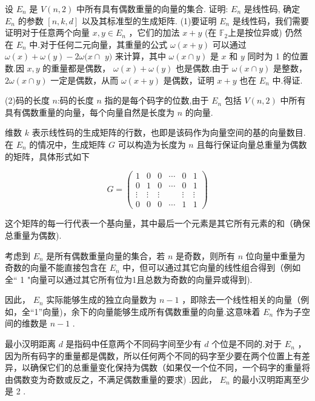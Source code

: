 \newpage
 \begin{tcolorbox}[breakable,colback=blue!5!white,colframe=blue!75!black,
 title= 解答题]

设 $ E_{n} $ 是 $ V(n, 2) $ 中所有具有偶数重量的向量的集合. 证明: $ E_{n} $ 是线性码, 确定 $ E_{n} $ 的参数 $ [n, k, d] $ 以及其标准型的生成矩阵.
\tcblower
 (1)要证明 $ E_{n} $ 是线性码，我们需要证明对于任意两个向量 $ x, y \in E_{n} $ ，它们的加法 $ x+y $ (在 $ \mathbb{F}_{2} $上是按位异或) 仍然在 $ E_{n} $ 中.对于任何二元向量，其重量的公式 $ \omega(x+y) $ 可以通过 $ \omega(x)+\omega(y)-2 \omega(x \cap $ $ y) $ 来计算，其中 $ \omega(x \cap y) $ 是 $ x $ 和 $ y $ 同时为 1 的位置数.因 $ x, y $ 的重量都是偶数， $ \omega(x)+\omega(y) $ 也是偶数.由于 $ \omega(x \cap y) $ 是整数， $ 2 \omega(x \cap y) $ 一定是偶数，从而 $ \omega(x+y) $ 是偶数，证明 $ x+y $ 也在 $ E_{n} $ 中.得证.

(2)码的长度 $ n $:码的长度 $ n $ 指的是每个码字的位数,由于 $ E_{n} $ 包括 $ V(n, 2) $ 中所有具有偶数重量的向量，每个向量自然是长度为 $ n $ 的向量.

维数 $ k $ 表示线性码的生成矩阵的行数，也即是该码作为向量空间的基的向量数目.在 $ E_{n} $ 的情况中，生成矩阵 $ G $ 可以构造为长度为 $ n $ 且每行保证向量总重量为偶数的矩阵，具体形式如下

$$
G=\left(\begin{array}{cccccc}
1 & 0 & 0 & \cdots & 0 & 1 \\
0 & 1 & 0 & \cdots & 0 & 1 \\
\vdots & \vdots & \vdots & & \vdots & \vdots \\
0 & 0 & 0 & \cdots & 1 & 1
\end{array}\right)
$$

这个矩阵的每一行代表一个基向量，其中最后一个元素是其它所有元素的和（确保总重量为偶数).

考虑到 $ E_{n} $ 是所有偶数重量向量的集合，若 $ n $ 是奇数，则所有 $ n $ 位向量中重量为奇数的向量不能直接包含在 $ E_{n} $ 中，但可以通过其它向量的线性组合得到（例如全“ 1 "向量可以通过其它所有位为1且总数为奇数的向量异或得到).

因此， $ E_{n} $ 实际能够生成的独立向量数为 $ n-1 $ ，即除去一个线性相关的向量（例如，全“1”向量)，余下的向量能够生成所有偶数重量的向量.这意味着 $ E_{n} $ 作为子空间的维数是 $ n-1 $ .


最小汉明距离 $ d $ 是指码中任意两个不同码字间至少有 $ d $ 个位是不同的.对于 $ E_{n} $ ，因为所有码字的重量都是偶数，所以任何两个不同的码字至少要在两个位置上有差异，以确保它们的总重量变化保持为偶数（如果仅一个位不同，一个码字的重量将由偶数变为奇数或反之，不满足偶数重量的要求) .因此， $ E_{n} $ 的最小汉明距离至少是 2 .


\end{tcolorbox}
